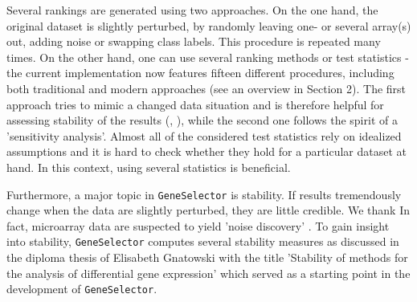 Several rankings are generated using two approaches. On the one hand, the
original dataset is slightly perturbed, by randomly leaving one- or several
array(s) out, adding noise or swapping class labels. This procedure is repeated
many times. On the other hand,
one can use several ranking methods or test statistics - the current
implementation now features fifteen different procedures, including both traditional
and modern approaches (see an overview in Section 2).
The first approach tries to mimic a changed data situation and is therefore
helpful for assessing stability of the results (\citet{Pavlidis1}, \citet{Qiu}), while the
second one follows the spirit of a 'sensitivity analysis'. Almost all of the
considered test statistics rely on idealized assumptions and it is hard to check
whether they hold for a particular dataset at hand. In this context, using several
statistics is beneficial.

Furthermore, a major topic in \texttt{GeneSelector} is stability. If results tremendously
change when the data are slightly perturbed, they are little credible. We thank
In fact, microarray data are suspected to yield 'noise discovery' \citet{Ioannidis:noisy}.
To gain insight into stability, \texttt{GeneSelector} computes several
stability measures as discussed in the diploma thesis of Elisabeth
Gnatowski with the title 'Stability of methods for the analysis of differential
gene expression' \citet{Gnatowski2007} which served as a starting point in the
development of \texttt{GeneSelector}.

